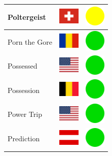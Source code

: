 \documentclass[12pt, a4paper, twoside]{report}
\begin{document}
\begin{center}
\begin{longtable}{|p{5cm}|p{2cm}|p{2cm}|}
Poltergeist & \includegraphics[width=1cm]{4x3/ch} & \includegraphics[width=1cm]{likes/m} \\ \hline
Porn the Gore & \includegraphics[width=1cm]{4x3/ro} & \includegraphics[width=1cm]{likes/y} \\ \hline
Possessed & \includegraphics[width=1cm]{4x3/us} & \includegraphics[width=1cm]{likes/y} \\ \hline
Possession & \includegraphics[width=1cm]{4x3/be} & \includegraphics[width=1cm]{likes/y} \\ \hline
Power Trip & \includegraphics[width=1cm]{4x3/us} & \includegraphics[width=1cm]{likes/y} \\ \hline
Prediction & \includegraphics[width=1cm]{4x3/at} & \includegraphics[width=1cm]{likes/y} \\ \hline

\end{longtable}
\end{center}
\end{document}
